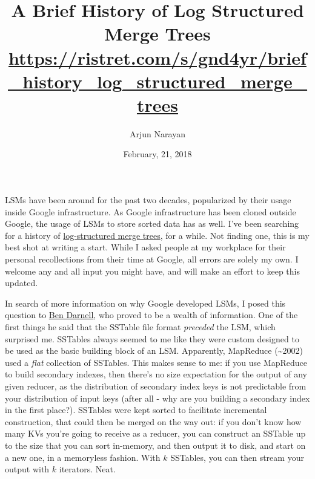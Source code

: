 \documentclass[a4paper,12pt,notitlepage,twoside,openright]{article}
\title{A Brief History of Log Structured Merge Trees \\{\footnotesize \url{https://ristret.com/s/gnd4yr/brief_history_log_structured_merge_trees}}}
\author{Arjun Narayan}
\date{February, 21, 2018}
\begin{document}
\maketitle

LSMs have been around for the past two decades, popularized by their
usage inside Google infrastructure. As Google infrastructure has been
cloned outside Google, the usage of LSMs to store sorted data has as
well. I've been searching for a history of
\href{https://en.wikipedia.org/wiki/Log-structured_merge-tree}{log-structured
merge trees}, for a while. Not finding one, this is my best shot at
writing a start. While I asked people at my workplace for their personal
recollections from their time at Google, all errors are solely my own. I
welcome any and all input you might have, and will make an effort to
keep this updated.

In search of more information on why Google developed LSMs, I posed this
question to \href{https://en.wikipedia.org/wiki/Ben_Darnell}{Ben
Darnell}, who proved to be a wealth of information. One of the first
things he said that the SSTable file format \emph{preceded} the LSM,
which surprised me. SSTables always seemed to me like they were custom
designed to be used as the basic building block of an LSM.
Apparently, MapReduce (\textasciitilde2002) used a \emph{flat}
collection of SSTables. This makes sense to me: if you use MapReduce to
build secondary indexes, then there's no size expectation for the output
of any given reducer, as the distribution of secondary index keys is not
predictable from your distribution of input keys (after all - why are
you building a secondary index in the first place?). SSTables were kept
sorted to facilitate incremental construction, that could then be merged
on the way out: if you don't know how many KVs you're going to receive
as a reducer, you can construct an SSTable up to the size that you can
sort in-memory, and then output it to disk, and start on a new one, in a
memoryless fashion. With \(k\) SSTables, you can then stream your
output with \(k\) iterators. Neat.
\end{document}
